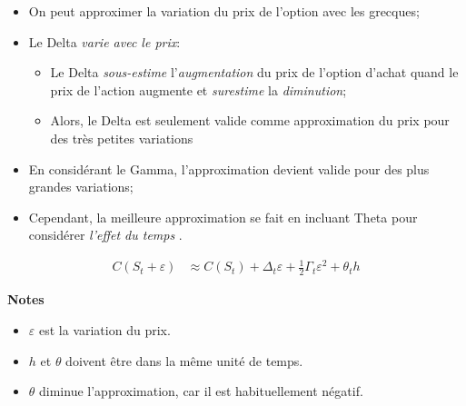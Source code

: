 \documentclass[10pt, french]{article}
\begin{document}
\begin{multicols*}{2}
\begin{itemize}[leftmargin = *]
	\item	On peut approximer la variation du prix de l'option avec les grecques;
	\item	Le Delta \textit{varie avec le prix}: 
		\begin{itemize}
		\item	Le Delta \textit{sous-estime} l'\textit{augmentation} du prix de l'option d'achat quand le prix de l'action augmente et \textit{surestime} la \textit{diminution};
		\item	Alors, le Delta est seulement valide comme approximation du prix pour des très petites variations
		\end{itemize}
	\item	En considérant le Gamma, l'approximation devient valide pour des plus grandes variations;
	\item	Cependant, la meilleure approximation se fait en incluant Theta pour considérer \textit{l'effet du temps} .
\end{itemize}

\begin{definitionNOHFILL}
\begin{align*}
	C(S_{t} + \varepsilon)
	&\approx	C(S_{t}) + \Delta_{t} \varepsilon + \frac{1}{2} \Gamma_{t} \varepsilon^{2} + \theta_{t} h
\end{align*}

\tcbline

\textbf{Notes}
\begin{itemize}[leftmargin = *]
	\item	$\varepsilon$ est la variation du prix.
	\item	$h$ et $\theta$ doivent être dans la même unité de temps.
	\item	$\theta$ diminue l'approximation, car il est habituellement négatif.
\end{itemize}
\end{definitionNOHFILL}


\newpage


\end{multicols*}
\end{document}
